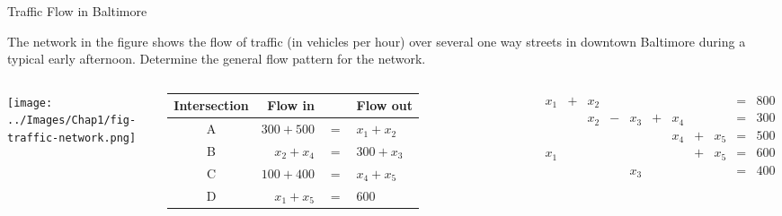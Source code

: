 \documentclass[xcolor=dvipsnames, aspectratio=169]{beamer}
\begin{document}
\begin{frame}{Traffic Flow in Baltimore}

  The network in the figure shows the flow of traffic (in vehicles per hour) over several one way streets in downtown Baltimore during a typical early afternoon. Determine the general flow pattern for the network.

  \begin{columns}
    \column{0.4\tw}
    
  \texttt{[image: ../Images/Chap1/fig-traffic-network.png]}

  \pause
  \column{0.6\tw}
  
  \begin{tabular}{crcl}
    \hline
    Intersection & Flow in & & Flow out\\
    \hline
    A & $300+500$ & $=$ & $x_1+x_2$\\
    B & $x_2 + x_4$ & $=$ & $300+x_3$\\
    C & $100+400$ & $=$ & $x_4+x_5$\\
    D & $x_1+x_5$ & $=$ & $600$\\
    \hline
  \end{tabular}

  \pause
  \[
  \begin{array}{ccccccccccc}
    x_1 & + & x_2 &   &         &    &        &   &          &= & 800\\
           &     & x_2 & - & x_3 & + & x_4 &   &         &=& 300\\
           &     &        &    &        &    & x_4 & + & x_5 &=& 500\\
    x_1 &     &        &    &       &     &        & + & x_5 &=& 600\\
           &      &        &   & x_3 &    &        &     &        &=& 400
  \end{array}
  \]

  \end{columns}
   
  \end{frame}
\end{document}
